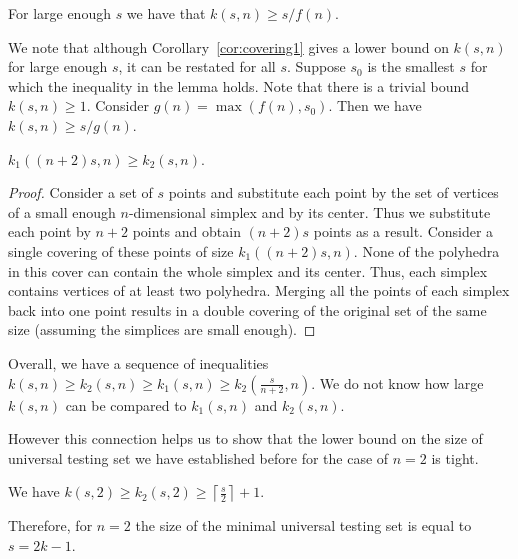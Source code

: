 \documentclass[11pt]{article}
\begin{document}
\begin{corollary} \label{cor:covering1}
For large enough $s$ we have that $k(s,n) \geq s/f(n)$.
\end{corollary}

\begin{remark}
We note that although Corollary~\ref{cor:covering1} gives a lower bound on $k(s,n)$ for large enough $s$, it can be restated for all $s$. Suppose $s_0$ is the smallest $s$ for which the inequality in the lemma holds. Note that there is a trivial bound $k(s,n)\geq 1$. Consider $g(n) = \max{(f(n),s_0)}$. Then we have $k(s,n) \geq s/g(n)$.
\end{remark}

\begin{lemma} \label{lem:covering2}
$k_1((n+2)s,n) \geq k_2(s,n)$. 
\end{lemma}

\begin{proof}
Consider a set of $s$ points and substitute each point by the set of vertices of a small enough $n$-dimensional simplex and by its center. Thus we substitute each point by $n+2$ points and obtain $(n+2)s$ points as a result. Consider a single covering of these points of size $k_1((n+2)s,n)$. None of the polyhedra in this cover can contain the whole simplex and its center. Thus, each simplex contains vertices of at least two polyhedra. Merging all the points of each simplex back into one point results in a double covering of the original set of the same size (assuming the simplices are small enough).
\end{proof}


Overall, we have a sequence of inequalities 
$
k(s,n) \geq k_2(s,n) \geq k_1(s,n) \geq k_2(\frac{s}{n+2},n).
$
We do not know how large $k(s,n)$ can be compared to $k_1(s,n)$ and $k_2(s,n)$. 

However this connection helps us to show that the lower bound on the size of universal testing set we have established before for the case of $n=2$ is tight.


\begin{theorem} \label{thm:univ_set_dim_2}
We have $k(s,2) \geq k_2(s,2) \geq \left\lceil \frac s2 \right\rceil + 1$.

Therefore, for $n=2$ the size of the minimal universal testing set is equal to $s = 2k-1$.
\end{theorem}
\end{document}
